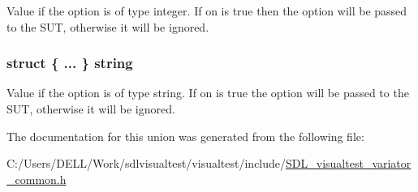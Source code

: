 Value if the option is of type integer. If on is true then the option will be passed to the S\-U\-T, otherwise it will be ignored. \hypertarget{union_s_d_l_visual_test___s_u_t_option_value_a2bf4b969ff9633c937e4d15118d1edc6}{
\subsubsection[{string}]{\setlength{\rightskip}{0pt plus 5cm}struct \{ ... \}   string}}\label{union_s_d_l_visual_test___s_u_t_option_value_a2bf4b969ff9633c937e4d15118d1edc6}
Value if the option is of type string. If on is true the option will be passed to the S\-U\-T, otherwise it will be ignored. 

The documentation for this union was generated from the following file\-:\begin{DoxyCompactItemize}
\item 
C\-:/\-Users/\-D\-E\-L\-L/\-Work/sdlvisualtest/visualtest/include/\hyperlink{_s_d_l__visualtest__variator__common_8h}{S\-D\-L\-\_\-visualtest\-\_\-variator\-\_\-common.\-h}\end{DoxyCompactItemize}
